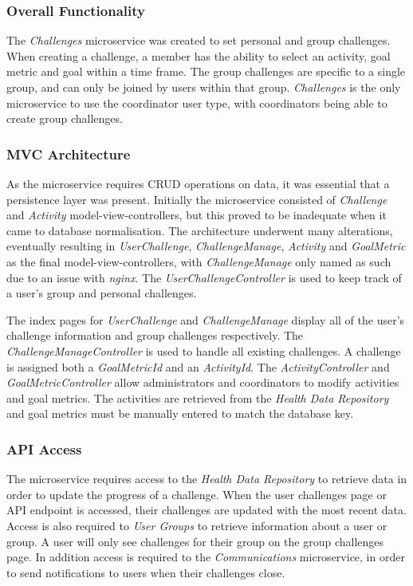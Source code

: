 \subsubsection{Overall Functionality}
\par
The \textit{Challenges} microservice was created to set personal and group challenges. When creating a challenge, a member has the ability to select an activity, goal metric and goal within a time frame. The group challenges are specific to a single group, and can only be joined by users within that group. \textit{Challenges} is the only microservice to use the coordinator user type, with coordinators being able to create group challenges. 

\subsubsection{MVC Architecture}
\par
As the microservice requires CRUD operations on data, it was essential that a persistence layer was present.
Initially the microservice consisted of \textit{Challenge} and \textit{Activity} model-view-controllers, but this proved to be inadequate when it came to database normalisation. The architecture underwent many alterations, eventually resulting in \textit{UserChallenge}, \textit{ChallengeManage}, \textit{Activity} and \textit{GoalMetric} as the final model-view-controllers, with \textit{ChallengeManage} only named as such due to an issue with \textit{nginx}. The \textit{UserChallengeController} is used to keep track of a user's group and personal challenges.

\par
The index pages for \textit{UserChallenge} and \textit{ChallengeManage} display all of the user's challenge information and group challenges respectively. The \textit{ChallengeManageController} is used to handle all existing challenges. A challenge is assigned both a \textit{GoalMetricId} and an \textit{ActivityId}. The \textit{ActivityController} and \textit{GoalMetricController} allow administrators and coordinators to modify activities and goal metrics. The activities are retrieved from the \textit{Health Data Repository} and goal metrics must be manually entered to match the database key.

\subsubsection{API Access}
\par
The microservice requires access to the \textit{Health Data Repository} to retrieve data in order to update the progress of a challenge. When the user challenges page or API endpoint is accessed, their challenges are updated with the most recent data.
Access is also required to \textit{User Groups} to retrieve information about a user or group. A user will only see challenges for their group on the group challenges page. 
In addition access is required to the \textit{Communications} microservice, in order to send notifications to users when their challenges close.

